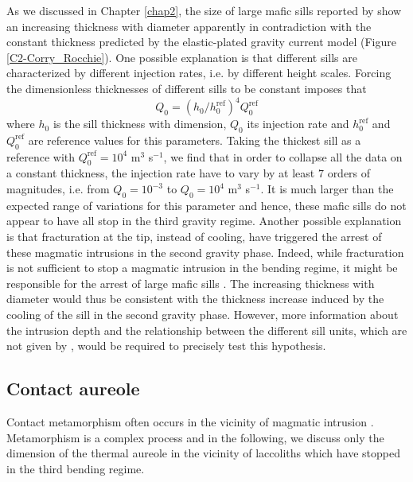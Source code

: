 As we discussed in Chapter \ref{chap2},  the size of large mafic sills
reported  by  \citet{Cruden:tg}  show  an  increasing  thickness  with
diameter  apparently  in  contradiction with  the  constant  thickness
predicted  by   the  elastic-plated  gravity  current   model  (Figure
\ref{C2-Corry_Rocchie}).  One  possible explanation is  that different
sills  are  characterized  by  different  injection  rates,  i.e.   by
different  height scales.   Forcing the  dimensionless thicknesses  of
different sills to be constant imposes that
\begin{equation}
  Q_0 = (h_0/h_0^{\text{ref}})^4Q_0^{\text{ref}}
\end{equation}
where $h_0$ is the sill  thickness with dimension, $Q_0$ its injection
rate  and  $h_0^{\text{ref}}$  and  $Q_0^{\text{ref}}$  are  reference
values for this  parameters.  Taking the thickest sill  as a reference
with $Q_0^{\text{ref}} =  10^4$ m$^3$ s$^{-1}$, we find  that in order
to collapse all  the data on a constant thickness,  the injection rate
have  to  vary by  at  least  $7$  orders  of magnitudes,  i.e.   from
$Q_0=10^{-3}$ to $Q_0= 10^{4}$ m$^3$  s$^{-1}$. It is much larger than
the expected range  of variations for this parameter  and hence, these
mafic  sills do  not appear  to  have all  stop in  the third  gravity
regime. Another possible explanation is  that fracturation at the tip,
instead  of  cooling, have  triggered  the  arrest of  these  magmatic
intrusions in the second gravity phase.  Indeed, while fracturation is
not sufficient to stop a magmatic  intrusion in the bending regime, it
might   be  responsible   for  the   arrest  of   large  mafic   sills
\citep{Michaut:2011kg}.  The increasing  thickness with diameter would
thus be consistent with the  thickness increase induced by the cooling
of the  sill in the  second gravity phase.  However,  more information
about the intrusion  depth and the relationship  between the different
sill  units,  which  are  not given  by  \citet{Cruden:tg},  would  be
required to precisely test this hypothesis.

\subsection{Contact aureole}
\label{sec:thermal-aureol}

Contact  metamorphism  often  occurs   in  the  vicinity  of  magmatic
intrusion
\citep{Jaeger:1959du,SILLITOE:1998bs,Senger:2014tt}. Metamorphism is a
complex process and in the following, we discuss only the dimension of
the thermal aureole  in the vicinity of laccoliths  which have stopped
in the third bending regime.

